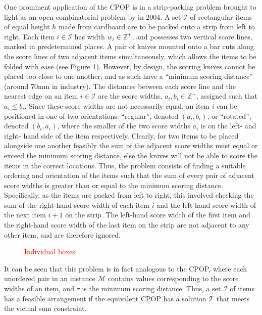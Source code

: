 \documentclass[oribibl]{llncs}
\begin{document}
One prominent application of the CPOP is in a strip-packing problem brought to light as an open-combinatorial problem by \citeauthor{goulimis2004} in 2004. A set $\mathcal{I}$ of rectangular items of equal height $h$ made from cardboard are to be packed onto a strip from left to right. Each item $i \in \mathcal{I}$ has width $w_i \in \mathbb{Z}^{+}$, and possesses two vertical score lines, marked in predetermined places. A pair of knives mounted onto a bar cuts along the score lines of two adjacent items simultaneously, which allows the items to be folded with ease (see Figure \ref{fig:boxknife}). However, by design, the scoring knives cannot be placed too close to one another, and as such have a ``minimum scoring distance'' (around 70mm in industry). The distances between each score line and the nearest edge on an item $i \in \mathcal{I}$ are the score widths, $a_i, b_i \in \mathbb{Z}^{+}$, assigned such that $a_i \leq b_i$. Since these score widths are not necessarily equal, an item $i$ can be positioned in one of two orientations: ``regular'', denoted $(a_i, b_i)$, or ``rotated'', denoted $(b_i, a_i)$, where the smaller of the two score widths $a_i$ is on the left- and right- hand side of the item respectively. Clearly, for two items to be placed alongside one another feasibly the sum of the adjacent score widths must equal or exceed the minimum scoring distance, else the knives will not be able to score the items in the correct locations. Thus, the problem consists of finding a suitable ordering and orientation of the items such that the sum of every pair of adjacent score widths is greater than or equal to the minimum scoring distance. Specifically, as the items are packed from left to right, this involved checking the sum of the right-hand score width of each item $i$ and the left-hand score width of the next item $i+1$ on the strip. The left-hand score width of the first item and the right-hand score width of the last item on the strip are not adjacent to any other item, and are therefore ignored. 


\begin{figure}[h!]	
	\centering
	
	\caption{\textcolor{red}{Individual boxes.}}	
	\label{fig:boxknife}
\end{figure}

It can be seen that this problem is in fact analogous to the CPOP, where each unordered pair in an instance $\mathcal{M}$ contains values corresponding to the score widths of an item, and $\tau$ is the minimum scoring distance. Thus, a set $\mathcal{I}$ of items has a feasible arrangement if the equivalent CPOP has a solution $\mathcal{T}$ that meets the vicinal sum constraint.
\end{document}

